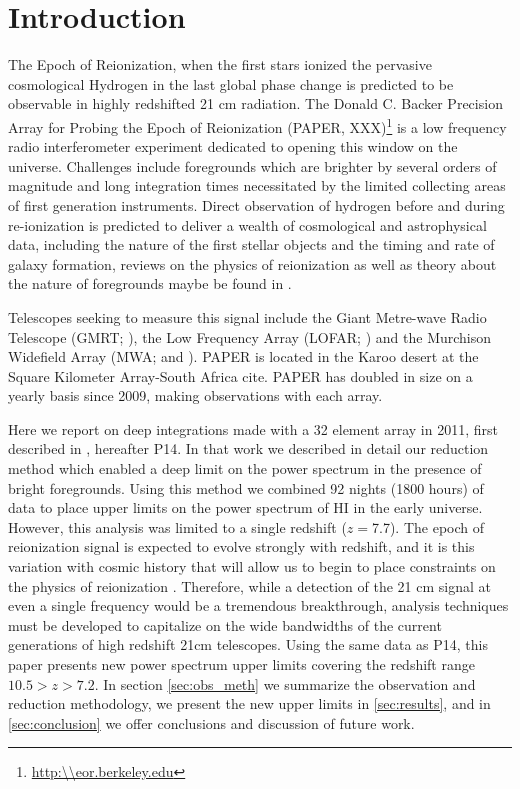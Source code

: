 \documentclass[preprint]{aastex}
\begin{document}


\section{Introduction}
The Epoch of Reionization, when the first stars ionized the pervasive cosmological Hydrogen in the last global phase change is predicted to be observable in highly redshifted 21 cm radiation.  The Donald C. Backer Precision Array for Probing the Epoch of Reionization (PAPER, XXX)\footnote{\url{http:\\eor.berkeley.edu}} is a low frequency radio interferometer experiment dedicated to opening this window on the universe.  Challenges include foregrounds which are brighter by several orders of magnitude and long integration times necessitated by the limited collecting areas of first generation instruments. Direct observation of hydrogen before and during re-ionization is predicted to deliver a wealth of cosmological and astrophysical data, including the nature of the first stellar objects and the timing and rate of galaxy formation, reviews on the physics of reionization as well as theory about the nature of foregrounds maybe be found in \citet{Furlanetto:2006p2267,Morales:2010p8093,Pritchard:2012p9555}.  

Telescopes seeking to measure this signal include the Giant Metre-wave Radio Telescope (GMRT; \cite{Paciga:2013p9943}), the Low Frequency Array (LOFAR; \cite{Yatawatta:2013p9699}) and the Murchison Widefield Array (MWA; \cite{Bowman:2013p9950} and \cite{Tingay:2013p9022}). PAPER is located in the Karoo desert at the Square Kilometer Array-South Africa cite. PAPER has doubled in size on a yearly basis since 2009, making observations with each array.  


Here we report on deep integrations made with a 32 element array in 2011, first described in \cite{Parsons:2013p9876}, hereafter P14.  In that work we described in detail our reduction method which enabled a deep limit on the power spectrum in the presence of bright foregrounds. Using this method we combined 92 nights (1800 hours) of data to place upper limits on the power spectrum of HI in the early universe.  However, this analysis was limited to a single redshift ($z=$7.7).  The epoch of reionization signal is expected to evolve strongly with redshift, and it is this variation with cosmic history that will allow us to begin to place constraints on the physics of reionization \cite{Pritchard:2008p8123,Pober:2014p10390}.  Therefore, while a detection of the 21 cm signal at even a single frequency would be a tremendous breakthrough, analysis techniques must be developed to capitalize on the wide bandwidths of the current generations of high redshift 21cm telescopes.  Using the same data as P14, this paper presents new power spectrum upper limits covering the redshift range $10.5>z>7.2$.  In section  \ref{sec:obs_meth} we summarize the observation and reduction methodology, we present the new upper limits in \ref{sec:results}, and in \ref{sec:conclusion} we offer conclusions and discussion of future work.
\end{document}
